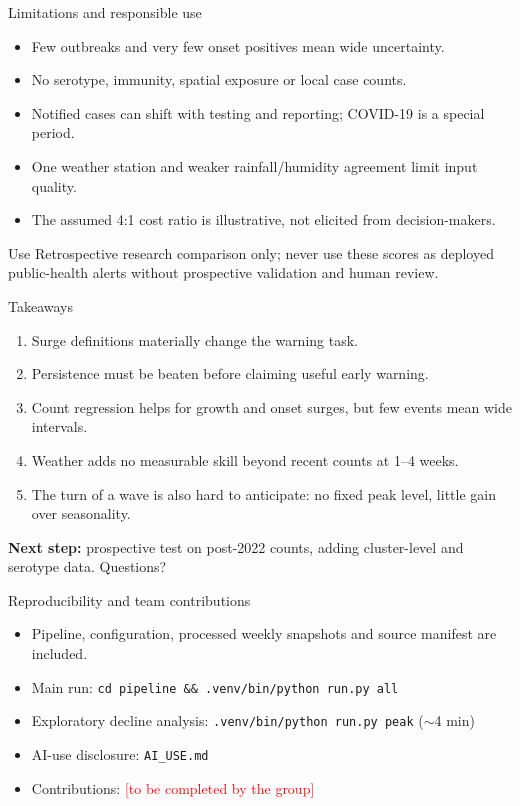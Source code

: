 \documentclass[aspectratio=169,11pt]{beamer}
\begin{document}
\begin{frame}{Limitations and responsible use}
  \begin{itemize}
    \item Few outbreaks and very few onset positives mean wide uncertainty.
    \item No serotype, immunity, spatial exposure or local case counts.
    \item Notified cases can shift with testing and reporting; COVID-19 is a special period.
    \item One weather station and weaker rainfall/humidity agreement limit input quality.
    \item The assumed 4:1 cost ratio is illustrative, not elicited from decision-makers.
  \end{itemize}
  \begin{block}{Use}
    Retrospective research comparison only; never use these scores as deployed public-health
    alerts without prospective validation and human review.
  \end{block}
\end{frame}

\begin{frame}{Takeaways}
  \begin{enumerate}
    \item Surge definitions materially change the warning task.
    \item Persistence must be beaten before claiming useful early warning.
    \item Count regression helps for growth and onset surges, but few events mean wide intervals.
    \item Weather adds no measurable skill beyond recent counts at 1--4 weeks.
    \item The turn of a wave is also hard to anticipate: no fixed peak level, little gain
      over seasonality.
  \end{enumerate}
  \vspace{0.3em}
  \textbf{Next step:} prospective test on post-2022 counts, adding cluster-level and serotype data.
  \vspace{1em}
  \centering
  \Large Questions?
\end{frame}

\appendix
\begin{frame}{Reproducibility and team contributions}
  \begin{itemize}
    \item Pipeline, configuration, processed weekly snapshots and source manifest are included.
    \item Main run: \texttt{cd pipeline \&\& .venv/bin/python run.py all}
    \item Exploratory decline analysis: \texttt{.venv/bin/python run.py peak} ($\sim$4 min)
    \item AI-use disclosure: \texttt{AI\_USE.md}
    \item Contributions: \textcolor{red}{[to be completed by the group]}
  \end{itemize}
\end{frame}
\end{document}
